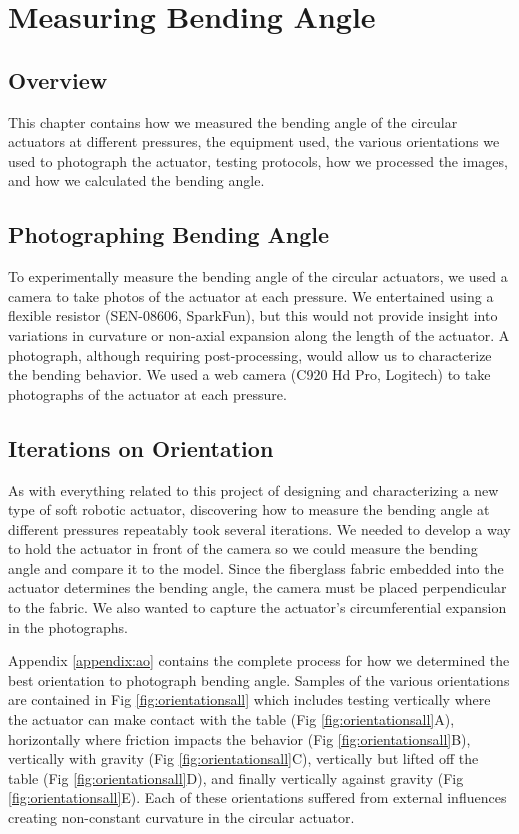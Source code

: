 \chapter{Measuring Bending Angle}
\label{chapter:bendingangle}

\section*{Overview}
This chapter contains how we measured the bending angle of the circular actuators at different pressures, the equipment used, the various orientations we used to photograph the actuator, testing protocols, how we processed the images, and how we calculated the bending angle.

\section{Photographing Bending Angle}

To experimentally measure the bending angle of the circular actuators, we used a camera to take photos of the actuator at each pressure. We entertained using a flexible resistor (SEN-08606, SparkFun), but this would not provide insight into variations in curvature or non-axial expansion along the length of the actuator. A photograph, although requiring post-processing, would allow us to characterize the bending behavior. We used a web camera (C920 Hd Pro, Logitech) to take photographs of the actuator at each pressure.

\section{Iterations on Orientation}

As with everything related to this project of designing and characterizing a new type of soft robotic actuator, discovering how to measure the bending angle at different pressures repeatably took several iterations. We needed to develop a way to hold the actuator in front of the camera so we could measure the bending angle and compare it to the model. Since the fiberglass fabric embedded into the actuator determines the bending angle, the camera must be placed perpendicular to the fabric. We also wanted to capture the actuator's circumferential expansion in the photographs. 

Appendix \ref{appendix:ao} contains the complete process for how we determined the best orientation to photograph bending angle. Samples of the various orientations are contained in Fig \ref{fig:orientationsall} which includes testing vertically where the actuator can make contact with the table (Fig \ref{fig:orientationsall}A), horizontally where friction impacts the behavior (Fig \ref{fig:orientationsall}B), vertically with gravity (Fig \ref{fig:orientationsall}C), vertically but lifted off the table (Fig \ref{fig:orientationsall}D), and finally vertically against gravity (Fig \ref{fig:orientationsall}E). Each of these orientations suffered from external influences creating non-constant curvature in the circular actuator. 


